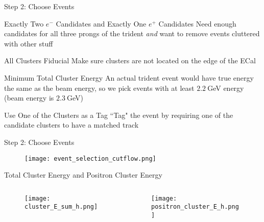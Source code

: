 \documentclass[aspectratio=169]{beamer}
\begin{document}
\begin{frame}{Step 2: Choose Events}
  \begin{block}{Exactly Two $e^-$ Candidates and Exactly One $e^+$ Candidates}
    Need enough candidates for all three prongs of the trident \emph{and} 
    want to remove events cluttered with other stuff
  \end{block}
  \begin{block}{All Clusters Fiducial}
    Make sure clusters are not located on the edge of the ECal
  \end{block}
  \begin{block}{Minimum Total Cluster Energy}
    An actual trident event would have true energy the same as the beam energy,
    so we pick events with at least $2.2~$GeV energy (beam energy is $2.3~$GeV)
  \end{block}
  \begin{block}{Use One of the Clusters as a Tag}
    ``Tag" the event by requiring one of the candidate clusters to have a matched track
  \end{block}
\end{frame}

\begin{frame}{Step 2: Choose Events}
  \centering
  \begin{figure}
    \texttt{[image: event\_selection\_cutflow.png]}
  \end{figure}
\end{frame}

\begin{frame}{Total Cluster Energy and Positron Cluster Energy}
  \begin{columns}
    \begin{column}{0.5\textwidth}
      \begin{figure}
        \centering
        \texttt{[image: cluster\_E\_sum\_h.png]}
      \end{figure}
    \end{column}
    \begin{column}{0.5\textwidth}
      \begin{figure}
        \centering
        \texttt{[image: positron\_cluster\_E\_h.png]}
      \end{figure}
    \end{column}
  \end{columns}
\end{frame}
\end{document}
